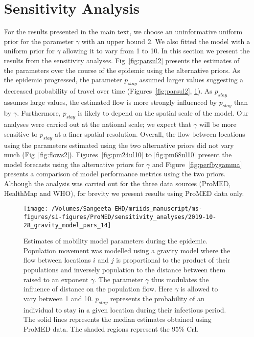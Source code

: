 \documentclass[9pt,twoside,lineno]{pnas-new}
\begin{document}
\section{Sensitivity Analysis}\label{sec:sensitivity-analysis}

For the results presented in the main text, we choose an uninformative
uniform prior for the parameter \(\gamma\) with an upper bound 2. We
also fitted the model with a uniform prior for \(\gamma\) allowing it to
vary from 1 to 10. In this section we present the results from the
sensitivity analyses. Fig~\ref{fig:parsul2} presents the
estimates of the parameters over the course of the epidemic using the
alternative priors. As the epidemic progressed, 
the parameter $p_{stay}$ assumed larger values suggesting a decreased
probability of travel over time (Figures~\ref{fig:parsul2},
\ref{fig:parsul10}). As $p_{stay}$ assumes large values,
the estimated flow is more strongly influenced by $p_{stay}$ than by
$\gamma$. Furthermore, $p_{stay}$ is likely to depend on the spatial
scale of the model. Our analyses were carried out at the
national scale; we expect that $\gamma$ will be more sensitive to
$p_{stay}$ at a finer spatial resolution. Overall, the  flow
between locations using the parameters estimated using the two
alternative priors did not vary much
(Fig~\ref{fig:flows2}). Figures~\ref{fig:pm24ul10} to \ref{fig:pm68ul10}
present the model forecasts using the alternative priors for $\gamma$
and Figure~\ref{fig:perfbygamma} presents a comparison of model
performance metrics using the two priors.
Although the analysis was carried out for the
three data sources (ProMED, HealthMap and WHO), for brevity we present
results using ProMED data only.


\begin{figure}
  \centering 
   \texttt{[image: /Volumes/Sangeeta EHD/mriids\_manuscript/ms-figures/si-figures/ProMED/sensitivity\_analyses/2019-10-28\_gravity\_model\_pars\_14]}
  \caption{Estimates of mobility model
  parameters during the epidemic. Population movement was modelled using a
  gravity model where the flow between locations \(i\) and \(j\) is
  proportional to the product of their populations and inversely
  population to the distance between them raised to an exponent \(\gamma\).
  The parameter \(\gamma\) thus modulates the influence of distance on the
  population flow. Here \(\gamma\) is allowed to vary between 1 and 10.
  \(p_{stay}\) represents the probability of an individual to stay in a
  given location during their infectious period. The solid lines
  represents the median estimates obtained using ProMED data. The shaded
  regions represent the 95\% CrI.}
\label{fig:parsul10}
\end{figure}\FloatBarrier
\end{document}
